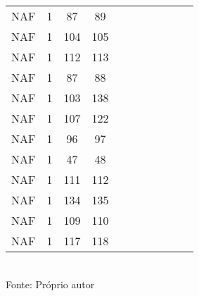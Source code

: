 \begin{table}[H]
{\begin{tabular}{ccccccccccc}
NAF & 1 & 87 & 89 &  &  &  &  &  &  &  \\
NAF & 1 & 104 & 105 &  &  &  &  &  &  &  \\
NAF & 1 & 112 & 113 &  &  &  &  &  &  &  \\
NAF & 1 & 87 & 88 &  &  &  &  &  &  &  \\
NAF & 1 & 103 & 138 &  &  &  &  &  &  &  \\
NAF & 1 & 107 & 122 &  &  &  &  &  &  &  \\
NAF & 1 & 96 & 97 &  &  &  &  &  &  &  \\
NAF & 1 & 47 & 48 &  &  &  &  &  &  &  \\
NAF & 1 & 111 & 112 &  &  &  &  &  &  &  \\
NAF & 1 & 134 & 135 &  &  &  &  &  &  &  \\
NAF & 1 & 109 & 110 &  &  &  &  &  &  &  \\
NAF & 1 & 117 & 118 &  &  &  &  &  &  &  \\
\bottomrule
\end{tabular}}
\\Fonte: Próprio autor
\end{table}


